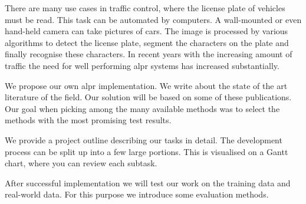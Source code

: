 
There are many use cases in traffic control, where the license plate of vehicles must be read. 
This task can be automated by computers. A wall-mounted or even hand-held camera can take pictures of cars.
The image is processed by various algorithms to detect the license plate, segment the characters on the plate and finally recognise these characters.
In recent years with the increasing amount of traffic the need for well performing \ac{alpr} systems has increased substantially.

We propose our own \ac{alpr} implementation.
We write about the state of the art literature of the field. Our solution will be based on some of these publications. Our goal when picking among the many available methods was to select the methods with the most promising test results.

We provide a project outline describing our tasks in detail. The development process can be split up into a few large portions. This is visualised on a Gantt chart, where you can review each subtask.

After successful implementation we will test our work on the training data and real-world data.
For this purpose we introduce some evaluation methods.










